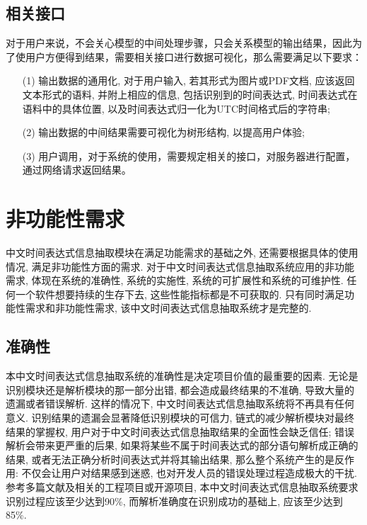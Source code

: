 \subsection{相关接口}

对于用户来说，不会关心模型的中间处理步骤，只会关系模型的输出结果，因此为了使用户方便得到结果，需要相关接口进行数据可视化，那么需要满足以下要求：
\begin{enumerate}
    \item[(1)] 输出数据的通用化, 对于用户输入, 若其形式为图片或PDF文档, 应该返回文本形式的语料, 并附上相应的信息, 包括识别到的时间表达式, 时间表达式在语料中的具体位置, 以及时间表达式归一化为UTC时间格式后的字符串;
    \item[(2)]  输出数据的中间结果需要可视化为树形结构, 以提高用户体验;
    \item[(3)]  用户调用，对于系统的使用，需要规定相关的接口，对服务器进行配置，通过网络请求返回结果。
\end{enumerate}

\section{非功能性需求}

中文时间表达式信息抽取模块在满足功能需求的基础之外, 还需要根据具体的使用情况, 满足非功能性方面的需求.
对于中文时间表达式信息抽取系统应用的非功能需求, 体现在系统的准确性, 系统的实施性, 系统的可扩展性和系统的可维护性.
任何一个软件想要持续的生存下去, 这些性能指标都是不可获取的. 只有同时满足功能性需求和非功能性需求, 该中文时间表达式信息抽取系统才是完整的.

\subsection{准确性}

本中文时间表达式信息抽取系统的准确性是决定项目价值的最重要的因素. 
无论是识别模块还是解析模块的那一部分出错, 都会造成最终结果的不准确, 导致大量的遗漏或者错误解析. 
这样的情况下, 中文时间表达式信息抽取系统将不再具有任何意义.
识别结果的遗漏会显著降低识别模块的可信力, 链式的减少解析模块对最终结果的掌握权, 用户对于中文时间表达式信息抽取结果的全面性会缺乏信任;
错误解析会带来更严重的后果, 如果将某些不属于时间表达式的部分语句解析成正确的结果, 或者无法正确分析时间表达式并将其输出结果, 那么整个系统产生的是反作用:
不仅会让用户对结果感到迷惑, 也对开发人员的错误处理过程造成极大的干扰. 
参考多篇文献及相关的工程项目或开源项目, 本中文时间表达式信息抽取系统要求识别过程应该至少达到90\%, 而解析准确度在识别成功的基础上, 应该至少达到85\%.


